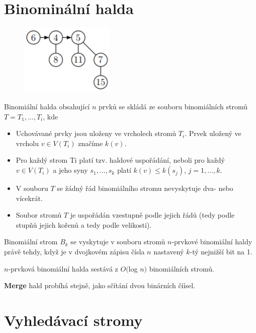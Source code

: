 \documentclass{szzclass}
\begin{document}
\newpage

\section{Binominální halda}

\begin{figure}[h]
\centering
\includegraphics[width=0.4\textwidth]{topics/bi-spol-5/images/binominal-heap.PNG}
\end{figure}

Binomiální halda obsahující $n$ prvků se skládá ze souboru
binomiálních stromů $T = T_1, . . . , T_i$, kde
\begin{itemize}
    \item Uchovávané prvky jsou uloženy ve vrcholech stromů $T_i$.
    Prvek uložený ve vrcholu $v \in V(T_i)$ značíme $k(v)$.
    \item  Pro každý strom Ti platí tzv. haldové uspořádání, neboli pro
    každý $v \in V(T_i)$ a jeho syny $s_1, . . . , s_k$ platí $k(v) \leq k(s_j)$,
    $j = 1, . . . , k$.
    \item V souboru $T$ se žádný řád binomiálního stromu nevyskytuje
    dva- nebo vícekrát.
    \item Soubor stromů $T$ je uspořádán vzestupně podle jejich řádů
    (tedy podle stupňů jejich kořenů a tedy podle velikosti).
\end{itemize}

Binomiální strom $B_k$ se vyskytuje v souboru stromů $n$-prvkové
binomiální haldy právě tehdy, když je v dvojkovém zápisu čísla $n$
nastavený $k$-tý nejnižší bit na 1.

$n$-prvková binomiální halda sestává z $O($log $n)$ binomiálních stromů.

\textbf{Merge} hald probíhá stejně, jako sčítání dvou binárních číísel.


\newpage

\section{Vyhledávací stromy}
\end{document}
